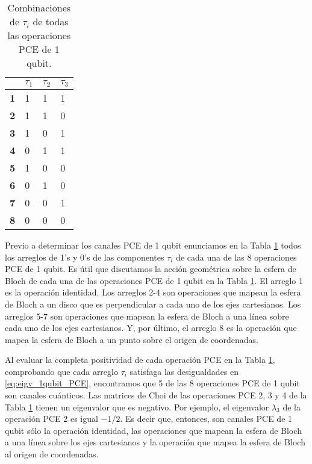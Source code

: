 \begin{table}[] 
\centering
\begin{tabular}{|l|l|l|l|}
\hline
           & $\tau_1$ & $\tau_2$ & $\tau_3$ \\ \hline
\textbf{1} & 1        & 1        & 1        \\ \hline
\textbf{2} & 1        & 1        & 0        \\ \hline
\textbf{3} & 1        & 0        & 1        \\ \hline
\textbf{4} & 0        & 1        & 1        \\ \hline
\textbf{5} & 1        & 0        & 0        \\ \hline
\textbf{6} & 0        & 1        & 0        \\ \hline
\textbf{7} & 0        & 0        & 1        \\ \hline
\textbf{8} & 0        & 0        & 0        \\ \hline
\end{tabular}
\caption{Combinaciones de $\tau_i$ de todas las operaciones PCE de 1 qubit. 
}
\label{tab:1qubit_PCE}
\end{table}

Previo a determinar los canales PCE de 1 qubit enunciamos en la Tabla
\ref{tab:1qubit_PCE} todos los arreglos de 1's y 0's de las 
componentes $\tau_i$ de cada una de las 8 operaciones PCE de 1 qubit. 
Es útil que discutamos la acción geométrica sobre la esfera de Bloch de 
cada una de las operaciones PCE de 1 qubit en la Tabla \ref{tab:1qubit_PCE}.
El arreglo 1 es la operación identidad. Los arreglos 2-4 son operaciones
que mapean la esfera de Bloch a un disco que es perpendicular 
a cada uno de los ejes cartesianos. Los arreglos 
5-7 son operaciones que mapean la esfera de Bloch a una línea sobre cada
uno de los ejes cartesianos. Y, por último, el arreglo 8 es la operación 
que mapea la esfera de Bloch a un punto sobre el origen de coordenadas. 

Al evaluar la completa positividad de cada operación PCE en la Tabla
\ref{tab:1qubit_PCE}, comprobando que cada arreglo $\tau_i$ 
satisfaga las desigualdades en \eqref{eq:eigv_1qubit_PCE},
encontramos que 5 de las 8 operaciones PCE de 1 qubit
son canales cuánticos. Las matrices de Choi de las operaciones PCE 
2, 3 y 4 de la Tabla \ref{tab:1qubit_PCE} tienen un eigenvalor que es negativo. 
Por ejemplo, el eigenvalor $\lambda_3$ de la operación PCE 2 
es igual $-1/2$. Es decir que, entonces, son canales PCE de 1 qubit 
sólo la operación identidad, las operaciones que 
mapean la esfera de Bloch a una línea sobre los ejes cartesianos y la 
operación que mapea la esfera de Bloch al origen de coordenadas.

